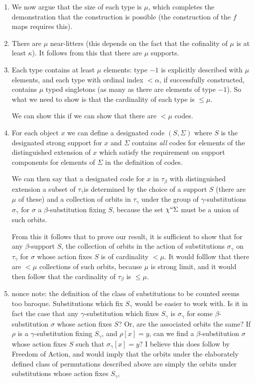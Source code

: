 \documentclass[12pt]{article}
\begin{document}
\begin{enumerate}
\item  We now argue that the size of each type is $\mu$, which completes the demonstration that the construction is possible (the construction of the $f$ maps requires this).

\item  There are $\mu$ near-litters (this depends on the fact that the cofinality of $\mu$ is at least $\kappa$).  It follows from this that there are $\mu$ supports.

\item  Each type contains at least $\mu$ elements:  type $-1$ is explicitly described with $\mu$ elements, and each type with ordinal index $<\alpha$, if successfully constructed, contains $\mu$ typed singletons (as many as there are elements of type $-1$).
So what we need to show is that the cardinality of each type is $\leq \mu$.

We can show this if we can show that there are $<\mu$ codes.

\item  For each object $x$ we can define a designated code $(S,\Sigma)$ where $S$ is the designated strong support for $x$ and $\Sigma$ contains {\em all\/} codes for elements of the distinguished extension of $x$ which satisfy the requirement on support components for elements of $\Sigma$ in the definition of codes.

We can then say that a designated code for $x$ in $\tau_\beta$ with distinguished extension a subset of $\tau_\gamma$is determined by the choice of a support $S$ (there are $\mu$ of these) and a collection of orbits in $\tau_\gamma$ under the group of $\gamma$-substitutions $\sigma_\gamma$  for 
$\sigma$ a $\beta$-substitution fixing  $S$, because the set $\chi``\Sigma$ must be a union of such orbits.

From this it follows that to prove our result, it is sufficient to show that for any $\beta$-support $S$, the collection of orbits in the action of substitutions $\sigma_\gamma$ on $\tau_\gamma$ for $\sigma$ whose action fixes $S$ is of cardinality $<\mu$.  It would folllow that there are $<\mu$ collections of such orbits, because $\mu$ is strong limit, and it would then follow that the cardinality of $\tau_\beta$ is $\leq \mu$.

\item  nonce note: the definition of the class of substitutions to be counted seems too baroque.  Substitutions which fix $S_\gamma$ would be easier to work with.  Is it in fact the case that any $\gamma$-substitution which fixes $S_\gamma$ is $\sigma_\gamma$ for some
$\beta$-substitution $\sigma$ whose action fixes $S$?  Or, are the associated orbits the same?  If $\rho$ is a $\gamma$-substitution fixing $S_\gamma$, and $\rho[x]=y$, can we find a $\beta$-substitution $\sigma$ whose action fixes $S$ such that
$\sigma_\gamma[x]=y$?  I believe this does follow by Freedom of Action, and would imply that the orbits under the elaborately defined class of permutations described above are simply the orbits under substitutions whose action fixes $S_\gamma$,


\end{enumerate}
\end{document}
